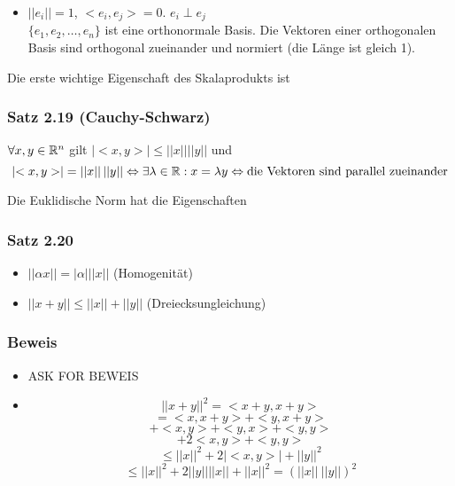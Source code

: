 \begin{definition}{2.17}
\begin{itemize}
\begin{center}
\begin{tikzpicture}[scale=1,smooth,
                        line cap=round,line join=round]
    \end{tikzpicture}
\end{center}

    \item $\left|\left|e_i\right|\right|=1$, $<e_i,e_j>=0$. $e_i \perp e_j$\\
$\{e_1,e_2,\dots,e_n\}$ ist eine orthonormale Basis. Die Vektoren einer orthogonalen Basis sind orthogonal zueinander und normiert (die Länge ist gleich 1).
\end{itemize}
\end{definition}
Die erste wichtige Eigenschaft des Skalaprodukts ist
\subsubsection*{Satz 2.19 (Cauchy-Schwarz)}
$\forall x,y\in\R^n$ gilt $\left| <x,y>\right| \leq \left|\left| x\right|\right| \left|\left| y\right|\right|$ und \[\left| <x,y>\right|=\left|\left| x\right|\right| \left|\left| y\right|\right|\Leftrightarrow \exists\lambda\in\R: x=\lambda y\Leftrightarrow \text{die Vektoren sind parallel zueinander}\]

Die Euklidische Norm hat die Eigenschaften
\subsubsection*{Satz 2.20}
\begin{itemize}
    \item $\left|\left| \alpha x\right|\right|=\left|\alpha\right|\left|\left| x\right|\right|$ (Homogenität)
    \item $\left|\left| x+y\right|\right| \leq \left|\left| x\right|\right| + \left|\left| y\right|\right|$ (Dreiecksungleichung)
\end{itemize}

\subsubsection*{Beweis}
\begin{itemize}
    \item ASK FOR BEWEIS 
    \item \[{\left|\left| x+y\right|\right|}^2=<x+y,x+y>\]
\[=<x,x+y>+<y,x+y>\]
\[<x,x>+<x,y>+<y,x>+<y,y>\]
\[<x,x>+2<x,y>+<y,y>\]
\[\leq {\left|\left| x \right|\right|}^2 + 2|<x,y>| + {\left|\left| y \right|\right|}^2\]
\[\leq {\left|\left| x \right|\right|}^2 + 2{\left|\left| y \right|\right|}  {\left|\left| x \right|\right|} + {\left|\left| x \right|\right|}^2 = (||x|| \: ||y||)^2\]
\end{itemize}

